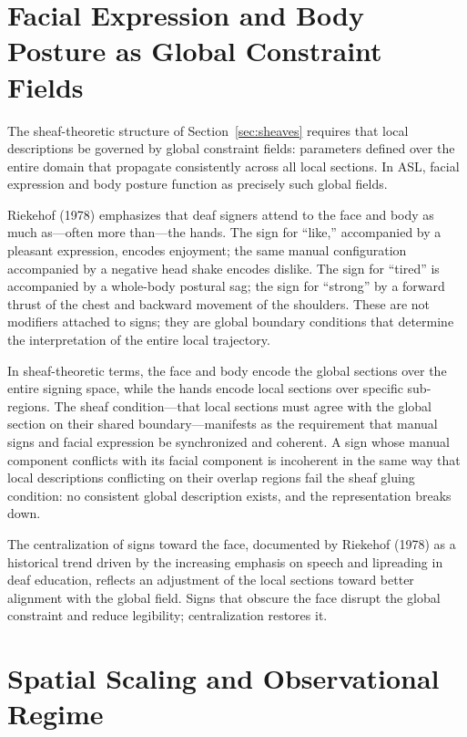 \documentclass[11pt,a4paper]{article}
\theoremstyle{definition}
\theoremstyle{remark}
\begin{document}
\section{Facial Expression and Body Posture as Global Constraint Fields}
\label{sec:asl_global}

The sheaf-theoretic structure of Section~\ref{sec:sheaves} requires that local descriptions be governed by global constraint fields: parameters defined over the entire domain that propagate consistently across all local sections. In ASL, facial expression and body posture function as precisely such global fields.

Riekehof (1978) emphasizes that deaf signers attend to the face and body as much as---often more than---the hands. The sign for ``like,'' accompanied by a pleasant expression, encodes enjoyment; the same manual configuration accompanied by a negative head shake encodes dislike. The sign for ``tired'' is accompanied by a whole-body postural sag; the sign for ``strong'' by a forward thrust of the chest and backward movement of the shoulders. These are not modifiers attached to signs; they are global boundary conditions that determine the interpretation of the entire local trajectory.

In sheaf-theoretic terms, the face and body encode the global sections over the entire signing space, while the hands encode local sections over specific sub-regions. The sheaf condition---that local sections must agree with the global section on their shared boundary---manifests as the requirement that manual signs and facial expression be synchronized and coherent. A sign whose manual component conflicts with its facial component is incoherent in the same way that local descriptions conflicting on their overlap regions fail the sheaf gluing condition: no consistent global description exists, and the representation breaks down.

The centralization of signs toward the face, documented by Riekehof (1978) as a historical trend driven by the increasing emphasis on speech and lipreading in deaf education, reflects an adjustment of the local sections toward better alignment with the global field. Signs that obscure the face disrupt the global constraint and reduce legibility; centralization restores it.

\section{Spatial Scaling and Observational Regime}
\label{sec:asl_scale}
\end{document}
